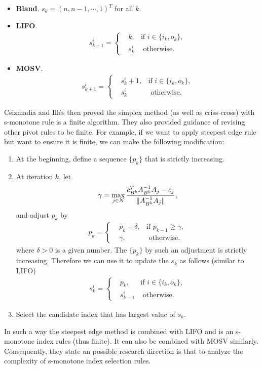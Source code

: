 \documentclass[11pt]{article}
\begin{document}
\begin{itemize}
\item \textbf{Bland}. $s_k = (n, n-1, \cdots, 1)^T$ for all $k$.
\item \textbf{LIFO}. \begin{align*}
s_{k+1}^i = \left\{
\begin{aligned}
&k, & \text{if } i \in \{i_k, o_k\},\\
&s_k^i & \text{ otherwise}. 
\end{aligned}
\right.
\end{align*}
\item \textbf{MOSV}. \begin{align*}
s_{k+1}^i = \left\{
\begin{aligned}
&s_k^{i} + 1, & \text{if } i \in \{i_k, o_k\},\\
&s_k^i & \text{ otherwise}. 
\end{aligned}
\right.
\end{align*}

\end{itemize}
Csizmadia and Illés \cite{csizmadia2012s} then proved the simplex method (as well as criss-cross) with s-monotone rule is a finite algorithm. They also provided guidance of revising other pivot rules to be finite. For example, if we want to apply steepest edge rule but want to ensure it is finite, we can make the following modification: 
\begin{enumerate}
\item At the beginning, define a sequence $\{p_k\}$ that is strictly increasing.
\item At iteration $k$, let
$$
\gamma = \max_{j \in N} \frac{c_{B^k}^TA_{B^k}^{-1}A_j - c_j}{\lVert A_{B^k}^{-1}A_j\rVert},
$$
and adjust $p_k$ by
 \begin{align*}
p_k = \left\{
\begin{aligned}
&p_k + \delta, & \text{if } p_{k-1} \ge \gamma,\\
&\gamma, & \text{ otherwise}. 
\end{aligned}
\right.
\end{align*}
where $\delta > 0$ is a given number. The $\{p_k\}$ by such an adjustment is strictly increasing. Therefore we can use it to update the $s_{k}$ as follows (similar to LIFO)
\begin{align*}
s_{k}^i = \left\{
\begin{aligned}
&p_k, & \text{if } i \in \{i_k, o_k\},\\
&s_{k-1}^i & \text{ otherwise}. 
\end{aligned}
\right.
\end{align*}
\item Select the candidate index that has largest value of $s_k$.
\end{enumerate}
In such a way the steepest edge method is combined with LIFO and is an s-monotone index rules (thus finite). It can also be combined with MOSV similarly. Consequently, they state an possible research direction is that to analyze the complexity of s-monotone index selection rules.
\end{document}
